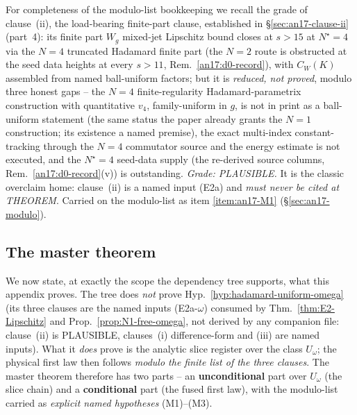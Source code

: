 \begin{remark}\label{rem:an17-clauseii-pointer}
For completeness of the modulo-list bookkeeping we recall the grade of
clause~(ii), the load-bearing finite-part clause, established in
\S\ref{sec:an17-clause-ii} (part~4): its finite part $W_g$ mixed-jet
Lipschitz bound closes at $s>15$ at $N^\star{=}4$ via the $N=4$ truncated
Hadamard finite part (the $N=2$ route is obstructed at the seed data
heights at every $s>11$, Rem.~\ref{an17:d0-record}), with $C_W(K)$
assembled from named ball-uniform factors; but it is \emph{reduced, not
proved}, modulo three honest gaps -- the $N=4$ finite-regularity
Hadamard-parametrix construction with quantitative $v_4$, family-uniform
in $g$, is not in print as a ball-uniform statement (the same status the
paper already grants the $N=1$ construction; its existence a named
premise), the exact multi-index constant-tracking through the $N=4$
commutator source and the energy estimate is not executed, and the
$N^\star{=}4$ seed-data supply (the re-derived source columns,
Rem.~\ref{an17:d0-record}(v)) is outstanding.
\emph{Grade: PLAUSIBLE.}  It is the classic overclaim home: clause~(ii)
is a named input (E2a) and \emph{must never be cited at THEOREM}.
Carried on the modulo-list as item \ref{item:an17-M1}
(\S\ref{sec:an17-modulo}).
\end{remark}

\subsection{The master theorem}
\label{sec:an17-main}

We now state, at exactly the scope the dependency tree supports, what
this appendix proves.  The tree does \emph{not} prove
Hyp.~\ref{hyp:hadamard-uniform-omega} (its three clauses are the named
inputs (E2a-$\omega$) consumed by Thm.~\ref{thm:E2-Lipschitz} and
Prop.~\ref{prop:N1-free-omega}, not derived by any companion file:
clause~(ii) is PLAUSIBLE, clauses~(i) difference-form and (iii) are
named inputs).  What it \emph{does} prove is the analytic slice
register over the class $U_\omega$; the physical first law then follows
\emph{modulo the finite list of the three clauses}.  The master theorem
therefore has two parts -- an \textbf{unconditional} part over $U_\omega$
(the slice chain) and a \textbf{conditional} part (the fused first law),
with the modulo-list carried as \emph{explicit named hypotheses} (M1)--(M3).

